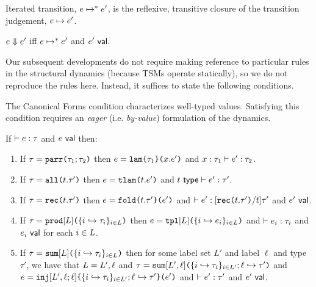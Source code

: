 \begingroup
\def\thetheorem{\ref{defn:iterated-transition-UP}}
\begin{definition} Iterated transition, $e \mapsto^{*} e'$, is the reflexive, transitive closure of the transition judgement, $e \mapsto e'$.\end{definition}
\endgroup

\begingroup
\def\thetheorem{\ref{defn:evaluation-UP}}
\begin{definition}[Evaluation] $e \Downarrow e'$ iff $e \mapsto^{*} e'$ and $e'~\mathsf{val}$. \end{definition}
\endgroup

Our subsequent developments do not require making reference to particular rules in the structural dynamics (because TSMs operate statically), so we do not reproduce the rules here. Instead, it suffices to state the following conditions.

The Canonical Forms condition characterizes well-typed values. Satisfying this condition requires an \emph{eager} (i.e. \emph{by-value}) formulation of the dynamics. 
\begingroup
\def\thetheorem{\ref{condition:canonical-forms-UP}}
\begin{condition} If $\vdash e : \tau$ and $e~\mathsf{val}$ then:
\begin{enumerate}
\item If $\tau=\texttt{parr}\texttt{(}\tau_1; \tau_2\texttt{)}$ then $e=\texttt{lam}\texttt{\{}\tau_1\texttt{\}(}x.e'\texttt{)}$ and $x : \tau_1 \vdash e' : \tau_2$.
\item If $\tau=\texttt{all}\texttt{(}t.\tau'\texttt{)}$ then $e=\texttt{tlam}\texttt{(}t.e'\texttt{)}$ and $t~\mathsf{type} \vdash e' : \tau'$.
\item If $\tau=\texttt{rec}\texttt{(}t.\tau'\texttt{)}$ then $e=\texttt{fold}\texttt{\{}t.\tau'\texttt{\}(}e'\texttt{)}$ and $\vdash e' : [\texttt{rec}\texttt{(}t.\tau'\texttt{)}/t]\tau'$ and $e'~\mathsf{val}$. 
\item If $\tau=\texttt{prod}[L]\texttt{(}\{i \hookrightarrow \tau_{i}\}_{i \in L}\texttt{)}$ then $e=\texttt{tpl}[L]\texttt{(}\{i \hookrightarrow e_{i}\}_{i \in L}\texttt{)}$ and $\vdash e_i : \tau_i$ and $e_i~\mathsf{val}$ for each $i \in L$.
\item If $\tau=\texttt{sum}[L]\texttt{(}\{i \hookrightarrow \tau_{i}\}_{i \in L}\texttt{)}$ then for some label set $L'$ and label $\ell$ and type $\tau'$, we have that $L=L', \ell$ and $\tau=\texttt{sum}[L', \ell]\texttt{(}\{i \hookrightarrow \tau_{i}\}_{i \in L'}; \ell \hookrightarrow \tau'\texttt{)}$ and $e=\texttt{inj}[L', \ell; \ell]\texttt{\{}\{i \hookrightarrow \tau_{i}\}_{i \in L'}; \ell \hookrightarrow \tau'\texttt{\}(}e'\texttt{)}$ and $\vdash e' : \tau'$ and $e'~\mathsf{val}$.
\end{enumerate}\end{condition}
\endgroup

